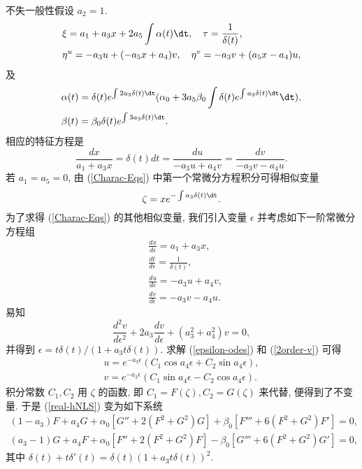 不失一般性假设 $a_2=1$.
\begin{align*}
&\xi=a_1+a_3x+2a_5\int\alpha(t)\dt,\quad \tau=\frac{1}{\delta(t)},\\
&\eta^u=-a_3u+(-a_5x+a_4)v,\quad \eta^v=-a_3v+(a_5x-a_4)u,
\end{align*}
及
\begin{align*}
&\alpha(t)=\delta(t)e^{\int2a_3\delta(t)\dt} (\alpha_0+3a_5\beta_0\int\delta(t)e^{\int a_3\delta(t)\dt}\dt),\notag\\ &\beta(t)=\beta_0\delta(t)e^{\int3a_3\delta(t)\dt}.
\end{align*}
相应的特征方程是
\begin{equation}\label{Charac-Eqs}
\frac{dx}{a_1+a_3x}=\delta(t)dt=\frac{du}{-a_3u+a_4v}=\frac{dv}{-a_3v-a_4u}.
\end{equation}
若 $a_1=a_5=0$, 由 (\ref{Charac-Eqs}) 中第一个常微分方程积分可得相似变量
\begin{equation}
\zeta=xe^{-\int a_3\delta(t)\dt}.
\end{equation}
为了求得 (\ref{Charac-Eqs}) 的其他相似变量, 我们引入变量 $\epsilon$ 并考虑如下一阶常微分方程组
\begin{equation}\label{epsilon-odes}
\begin{aligned}
&\frac{dx}{d\epsilon}=a_1+a_3x,\\
&\frac{dt}{d\epsilon}=\frac{1}{\delta(t)},\\
&\frac{du}{d\epsilon}=-a_3u+a_4v,\\
&\frac{dv}{d\epsilon}=-a_3v-a_4u.
\end{aligned}
\end{equation}
易知
\begin{equation}\label{2order-v}
\frac{d^2v}{d\epsilon^2}+2a_3\frac{dv}{d\epsilon}+(a_3^2+a_4^2)v=0,
\end{equation}
并得到 $\epsilon=t\delta(t)/(1+a_3t\delta(t))$. 求解 (\ref{epsilon-odes}) 和 (\ref{2order-v}) 可得
\begin{equation}
\begin{aligned}
u=e^{-a_3\epsilon}(C_1\cos{a_4\epsilon}+C_2\sin{a_4\epsilon}),\\
v=e^{-a_3\epsilon}(C_1\sin{a_4\epsilon}-C_2\cos{a_4\epsilon}).
\end{aligned}
\end{equation}
积分常数 $C_1, C_2$ 用 $\zeta$ 的函数, 即 $C_1=F(\zeta), C_2=G(\zeta)$ 来代替, 便得到了不变量. 于是 (\ref{real-hNLS}) 变为如下系统
\begin{equation}
\begin{aligned}
(1-a_3)F+a_4G+\alpha_0[G''+2(F^2+G^2)G]+\beta_0[F'''+6(F^2+G^2)F']=0,\\
(a_3-1)G+a_4F+\alpha_0[F''+2(F^2+G^2)F]-\beta_0[G'''+6(F^2+G^2)G']=0,
\end{aligned}
\end{equation}
其中 $\delta(t)+t\delta'(t)=\delta(t)(1+a_3t\delta(t))^2$.

